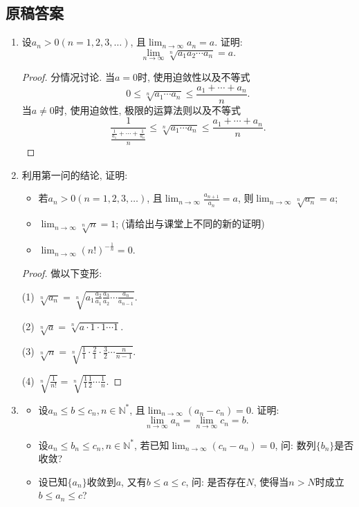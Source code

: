 \documentclass[UTF8,11pt, a4paper, oneside, fontset=none]{ctexbook}
\begin{document}
\clearpage

\subsection*{原稿答案}

\begin{enumerate}

\item 设$a_n>0 (n = 1, 2, 3, \ldots)$, 且$\lim_{n \to \infty} a_n =a$. 证明:
\[
\lim_{n \to \infty} \sqrt[n]{a_1 a_2 \cdots a_n} = a.
\]

\begin{proof}
分情况讨论. 当$a=0$时, 使用迫敛性以及不等式
\[
0 \leq \sqrt[n]{a_1 \cdots a_n} \leq \frac{a_1 + \cdots + a_n}{n}.
\]
当$a\neq 0$时, 使用迫敛性, 极限的运算法则以及不等式
\[
\frac{1}{\frac{\frac{1}{a_1} + \cdots + \frac{1}{a_n}}{n}}\leq \sqrt[n]{a_1 \cdots a_n} \leq \frac{a_1 + \cdots + a_n}{n}.
\]
\end{proof}


\item 利用第一问的结论, 证明:
\begin{itemize}
\item[(1)] 若$a_n>0 (n = 1, 2, 3, \ldots)$, 且$\lim_{n \to \infty}\frac{a_{n+1}}{a_n} =a$, 则$\lim_{n \to \infty} \sqrt[n]{a_n} =a$;
\item[(2)] $\lim_{n \to \infty} \sqrt[n]{n} =1$; (请给出与课堂上不同的新的证明)
\item[(3)] $\lim_{n \to \infty} (n!)^{-\frac{1}{n}} =0$.
\end{itemize} 

\begin{proof} 做以下变形:

(1) $\sqrt[n]{a_n} = \sqrt[n]{a_1 \frac{a_2}{a_1} \frac{a_3}{a_2}\cdots \frac{a_n}{a_{n-1}}}$.

(2) $\sqrt[n]{a} = \sqrt[n]{a \cdot 1 \cdot 1 \cdots 1}$.

(3) $\sqrt[n]{n} = \sqrt[n]{\frac{1}{1} \cdot \frac{2}{1} \cdot \frac{3}{2} \cdots \frac{n}{n-1}}$.

(4) $\sqrt[n]{\frac{1}{n!}} = \sqrt[n]{\frac{1}{1} \frac{1}{2} \cdots \frac{1}{n}}$.


\end{proof}

\item
\begin{itemize}
\item[(1)] 设$a_n \leq b \leq c_n, n \in \mathbb N^*$, 且$\lim_{n \to \infty} (a_n - c_n) =0$. 证明:
\[
\lim_{n \to \infty} a_n = \lim_{n \to \infty} c_n = b.
\]
\item[(2)] 设$a_n \leq b_n \leq c_n, n \in \mathbb N^*$, 若已知$\lim_{n \to \infty}(c_n -a_n) =0$, 问: 数列$\{b_n\}$是否收敛?
\item[(3)] 设已知$\{a_n\}$收敛到$a$, 又有$b \leq a \leq c$, 问: 是否存在$N$, 使得当$n >N$时成立$b \leq a_n \leq c$?
\end{itemize}



\end{enumerate}
\end{document}
